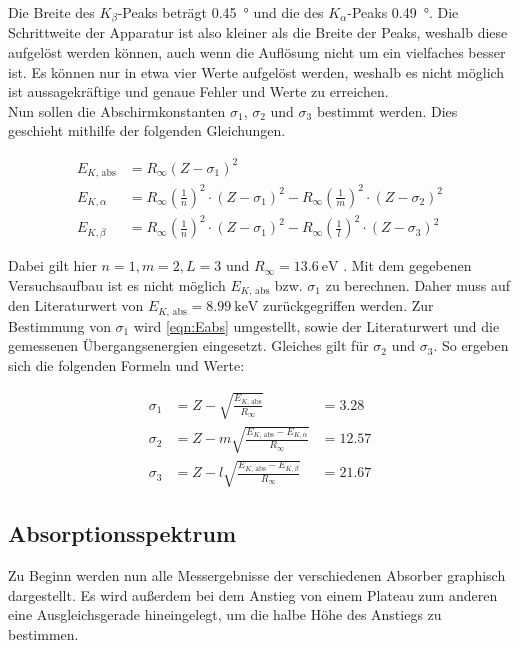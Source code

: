 \noindent Die Breite des $K_\beta$-Peaks beträgt \qty{0.45}{\degree} und die des $K_\alpha$-Peaks \qty{0.49}{\degree}. Die Schrittweite der Apparatur 
ist also kleiner als die Breite der Peaks, weshalb diese aufgelöst werden können, auch wenn die Auflösung nicht um ein vielfaches besser ist. 
Es können nur in etwa vier Werte aufgelöst werden, weshalb es nicht möglich ist aussagekräftige und genaue Fehler und Werte zu erreichen. \\

\noindent Nun sollen die Abschirmkonstanten $\sigma_1$, $\sigma_2$ und $\sigma_3$ bestimmt werden. Dies geschieht mithilfe der folgenden Gleichungen. 

\begin{align}
    \label{eqn:Eabs}
    E_{K\text{, abs}} &= R_\infty \left(Z-\sigma_1\right)^2 \\
    E_{K,\alpha}    &= R_\infty\left(\frac{1}{n}\right)^2 \cdot \left(Z- \sigma_1\right)^2 - R_\infty\left(\frac{1}{m}\right)^2 \cdot \left(Z- \sigma_2\right)^2 \\
    E_{K,\beta}     &= R_\infty\left(\frac{1}{n}\right)^2 \cdot \left(Z- \sigma_1\right)^2 - R_\infty\left(\frac{1}{l}\right)^2 \cdot \left(Z- \sigma_3\right)^2 
\end{align}
    
\noindent Dabei gilt hier $n=1, m=2, L=3$ und $R_\infty=\qty{13.6}{\electronvolt}$  \cite{Versuchsanleitung_v602}.
Mit dem gegebenen Versuchsaufbau ist es nicht möglich $E_{K\text{, abs}}$ bzw. $\sigma_1$ zu berechnen. Daher muss auf den Literaturwert von 
$E_{K\text{, abs}} = \qty{8.99}{\kilo \electronvolt}$ \cite{nist} zurückgegriffen werden. Zur Bestimmung von $\sigma_1$ wird \autoref{eqn:Eabs} umgestellt, sowie 
der Literaturwert und die gemessenen Übergangsenergien eingesetzt. Gleiches gilt für $\sigma_2$ und $\sigma_3$. So ergeben sich die folgenden Formeln und Werte:

\begin{align}
    \sigma_1 &= Z - \sqrt{\frac{E_{K\text{, abs}}}{R_\infty}}   &= 3.28 \\
    \sigma_2 &= Z - m \sqrt{\frac{E_{K\text{, abs}}-E_{K,\alpha}}{R_\infty}}    &= 12.57\\
    \sigma_3 &= Z - l \sqrt{\frac{E_{K\text{, abs}}-E_{K,\beta}}{R_\infty}}     &= 21.67
\end{align}

\subsection{Absorptionsspektrum}
Zu Beginn werden nun alle Messergebnisse der verschiedenen Absorber graphisch dargestellt. Es wird außerdem bei dem Anstieg von einem Plateau zum 
anderen eine Ausgleichsgerade hineingelegt, um die halbe Höhe des Anstiegs zu bestimmen.

